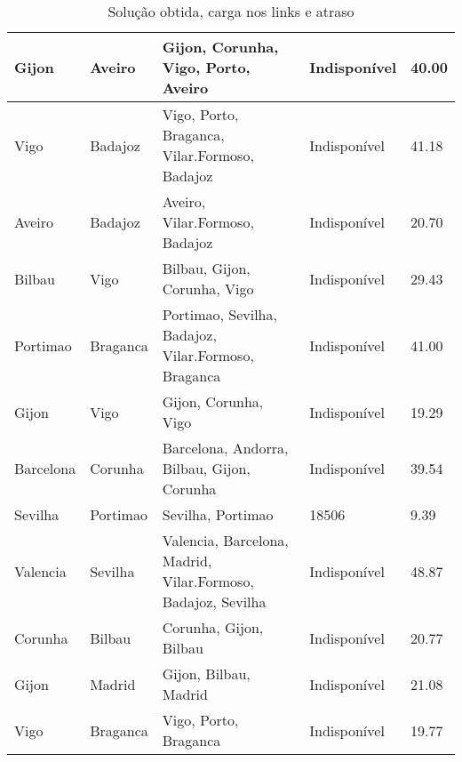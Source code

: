\begin{table}[!htb]
{\begin{tabular}{|l|l|l|l|l|}
Gijon & Aveiro & Gijon, Corunha, Vigo, Porto, Aveiro & Indisponível & 40.00 \\ \hline
Vigo & Badajoz & Vigo, Porto, Braganca, Vilar.Formoso, Badajoz & Indisponível & 41.18 \\ \hline
Aveiro & Badajoz & Aveiro, Vilar.Formoso, Badajoz & Indisponível & 20.70 \\ \hline
Bilbau & Vigo & Bilbau, Gijon, Corunha, Vigo & Indisponível & 29.43 \\ \hline
Portimao & Braganca & Portimao, Sevilha, Badajoz, Vilar.Formoso, Braganca & Indisponível & 41.00 \\ \hline
Gijon & Vigo & Gijon, Corunha, Vigo & Indisponível & 19.29 \\ \hline
Barcelona & Corunha & Barcelona, Andorra, Bilbau, Gijon, Corunha & Indisponível & 39.54 \\ \hline
Sevilha & Portimao & Sevilha, Portimao & 18506 & 9.39 \\ \hline
Valencia & Sevilha & Valencia, Barcelona, Madrid, Vilar.Formoso, Badajoz, Sevilha & Indisponível & 48.87 \\ \hline
Corunha & Bilbau & Corunha, Gijon, Bilbau & Indisponível & 20.77 \\ \hline
Gijon & Madrid & Gijon, Bilbau, Madrid & Indisponível & 21.08 \\ \hline
Vigo & Braganca & Vigo, Porto, Braganca & Indisponível & 19.77 \\ \hline
\end{tabular}}
\caption[]{Solução obtida, carga nos links e atraso}
\end{table}

